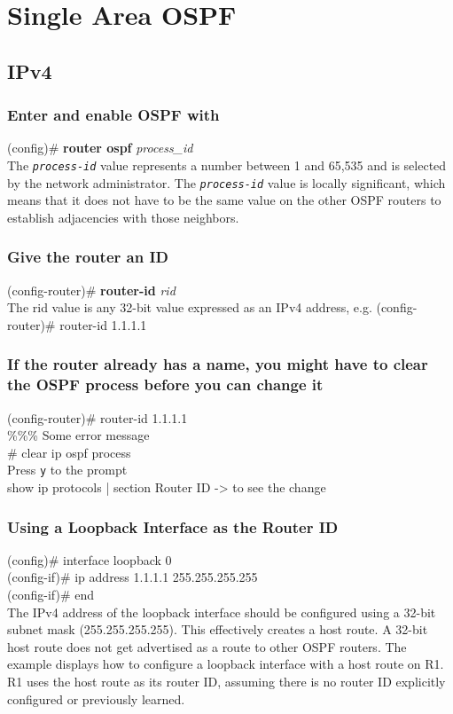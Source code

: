 \section{Single Area OSPF}
\subsection{IPv4}
\subsubsection*{Enter and enable OSPF with}
(config)\# \textbf{router ospf} \textit{process\_id}\vspace{4pt}\\
\textrm{The \texttt{\textit{process-id}} value represents a number between 1 and 65,535 and is selected by the network administrator. The \texttt{\textit{process-id}} value is locally significant, which means that it does not have to be the same value on the other OSPF routers to establish adjacencies with those neighbors.}
\subsubsection*{Give the router an ID}
(config-router)\# \textbf{router-id} \textit{rid}\vspace{4pt}\\
\textrm{The rid value is any 32-bit value expressed as an IPv4 address, e.g.} (config-router)\# router-id 1.1.1.1
\subsubsection*{If the router already has a name, you might have to clear the OSPF process before you can change it}
(config-router)\# router-id 1.1.1.1\vspace{11pt}\\
\%\%\% Some error message\vspace{11pt}\\
\# clear ip ospf process\\
\textrm{Press \texttt{y} to the prompt}\vspace{11pt}\\
show ip protocols | section Router ID -> to see the change

\subsubsection*{Using a Loopback Interface as the Router ID}
(config)\# interface loopback 0\\
(config-if)\# ip address 1.1.1.1 255.255.255.255\\
(config-if)\# end\\
\textrm{The IPv4 address of the loopback interface should be configured using a 32-bit subnet mask (255.255.255.255). This effectively creates a host route. A 32-bit host route does not get advertised as a route to other OSPF routers. 
The example displays how to configure a loopback interface with a host route on R1. R1 uses the host route as its router ID, assuming there is no router ID explicitly configured or previously learned.
}
